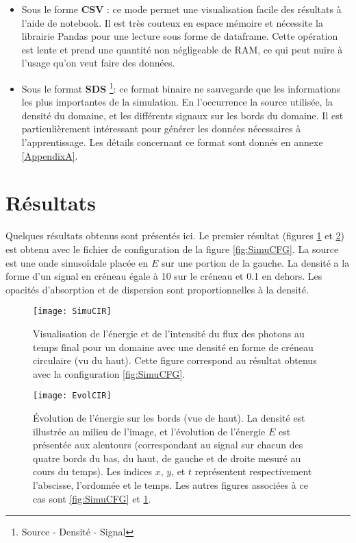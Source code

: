 \begin{itemize}
 \item Sous le forme \textbf{CSV} : ce mode permet une visualisation facile des résultats à l'aide de notebook. Il est très couteux en espace mémoire et nécessite la librairie Pandas pour une lecture sous forme de dataframe. Cette opération est lente et prend une quantité non négligeable de RAM, ce qui peut nuire à l'usage qu'on veut faire des données.
 
 \item Sous le format \textbf{SDS} \footnote{Source - Densité - Signal}: ce format binaire ne sauvegarde que les informations les plus importantes de la simulation. En l'occurrence la source utilisée, la densité du domaine, et les différents signaux sur les bords du domaine. Il est particulièrement intéressant pour générer les données nécessaires à l'apprentissage. Les détails concernant ce format sont donnés en annexe \ref{AppendixA}.
\end{itemize}


\section{Résultats}

Quelques résultats obtenus sont présentés ici. Le premier résultat (figures \ref{fig:SimuCIR} et \ref{fig:EvolCIR}) est obtenu avec le fichier de configuration de la figure \ref{fig:SimuCFG}. La source est une onde sinusoïdale placée en $E$ sur une portion de la gauche. La densité a la forme d'un signal en créneau égale à 10 sur le créneau et 0.1 en dehors. Les opacités d'absorption et de dispersion sont proportionnelles à la densité.

\begin{figure}[H]
\centering
\texttt{[image: SimuCIR]} 
\decoRule
\caption[SimuCIR]{Visualisation de l'énergie et de l'intensité du flux des photons au temps final pour un domaine avec une densité en forme de créneau circulaire (vu du haut). Cette figure correspond au résultat obtenus avec la configuration \ref{fig:SimuCFG}.}
\label{fig:SimuCIR}
\end{figure}

\begin{figure}[H]
\centering
\texttt{[image: EvolCIR]} 
\decoRule
\caption[EvolCIR]{Évolution de l'énergie sur les bords (vue de haut). La densité est illustrée au milieu de l'image, et l'évolution de l'énergie $E$ est présentée aux alentours (correspondant au signal sur chacun des quatre bords du bas, du haut, de gauche et de droite mesuré au cours du temps). Les indices $x$, $y$, et $t$ représentent respectivement l'abscisse, l'ordonnée et le temps. Les autres figures associées à ce cas sont \ref{fig:SimuCFG} et \ref{fig:SimuCIR}.}
\label{fig:EvolCIR}
\end{figure}

